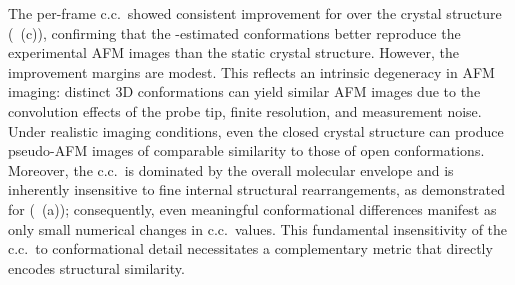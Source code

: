 The per-frame c.c.\ showed consistent improvement for \Model over the crystal structure (~(c)), confirming that the \Model-estimated conformations better reproduce the experimental AFM images than the static crystal structure.
However, the improvement margins are modest.
This reflects an intrinsic degeneracy in AFM imaging: distinct 3D conformations can yield similar AFM images due to the convolution effects of the probe tip, finite resolution, and measurement noise.
Under realistic imaging conditions, even the closed crystal structure can produce pseudo-AFM images of comparable similarity to those of open conformations.
Moreover, the c.c.\ is dominated by the overall molecular envelope and is inherently insensitive to fine internal structural rearrangements, as demonstrated for \AK (~(a)); consequently, even meaningful conformational differences manifest as only small numerical changes in c.c.\ values.
This fundamental insensitivity of the c.c.\ to conformational detail necessitates a complementary metric that directly encodes structural similarity.

